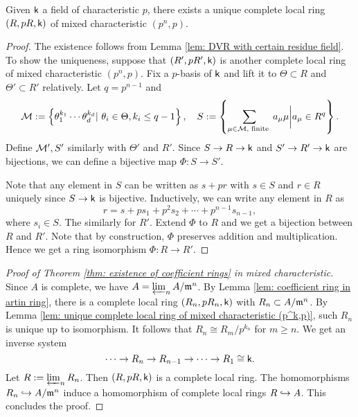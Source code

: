         \begin{lemma}\label{lem: unique complete local ring of mixed characteristic (p^k,p)}
            Given \({\mathsf{k}}\) a field of characteristic \(p\), 
            there exists a unique complete local ring \((R,pR,{\mathsf{k}})\) of mixed characteristic \((p^n,p)\).
        \end{lemma}
        \begin{proof}
            The existence follows from Lemma \ref{lem: DVR with certain residue field}.
            To show the uniqueness, suppose that \((R',pR',{\mathsf{k}})\) is another complete local ring of mixed characteristic \((p^n,p)\).
            Fix a \(p\)-basis of \({\mathsf{k}}\) and lift it to \(\Theta \subset R\) and \(\Theta' \subset R'\) relatively.
            Let \(q = p^{n-1}\) and 
            \[ {\mathcal{M}}:= \left\{ \theta_1^{k_1} \cdots \theta_d^{k_d} | \ \theta_i \in \Theta, k_i \leq q-1 \right\},\quad S := \left\{ \sum_{\mu \in {\mathcal{M}},\text{ finite }} a_\mu \mu \bigg| a_\mu \in R^q \right\}. \]
            Define \({\mathcal{M}}',S'\) similarly with \(\Theta'\) and \(R'\).
            Since \(S \to R \to {\mathsf{k}}\) and \(S' \to R' \to {\mathsf{k}}\) are bijections, we can define a bijective map \(\Phi: S \to S'\).

            Note that any element in \(S\) can be written as \(s + pr\) with \(s \in S\) and \(r \in R\) uniquely since \(S \to {\mathsf{k}}\) is bijective.
            Inductively, we can write any element in \(R\) as
            \[ r = s + ps_1 + p^2 s_2 + \cdots + p^{n-1} s_{n-1}, \]
            where \(s_i \in S\).
            The similarly for \(R'\).
            Extend \(\Phi\) to \(R\) and we get a bijection between \(R\) and \(R'\).
            Note that by construction, \(\Phi\) preserves addition and multiplication.
            Hence we get a ring isomorphism \(\Phi: R \to R'\).
        \end{proof}

        \begin{proof}[Proof of Theorem \ref{thm: existence of coefficient rings} in mixed characteristic]
            Since \(A\) is complete, we have \(A = \varprojlim_n A/{\mathfrak{m}}^n\).
            By Lemma \ref{lem: coefficient ring in artin ring}, there is a complete local ring \((R_n,pR_n,{\mathsf{k}})\) with \(R_n \subset A/{\mathfrak{m}}^n\).
            By Lemma \ref{lem: unique complete local ring of mixed characteristic (p^k,p)}, such \(R_n\) is unique up to isomorphism.
            It follows that \(R_n \cong R_m/p^{k_n}\) for \(m \geq n\).
            We get an inverse system 
            \[ \cdots \to R_n \to R_{n-1} \to \cdots \to R_1 \cong {\mathsf{k}}. \]
            Let \(R := \varprojlim_n R_n\).
            Then \((R,pR,{\mathsf{k}})\) is a complete local ring.
            The homomorphisms \(R_n \hookrightarrow A/{\mathfrak{m}}^n\) induce a homomorphism of complete local rings \(R \hookrightarrow A\).
            This concludes the proof.
        \end{proof}


